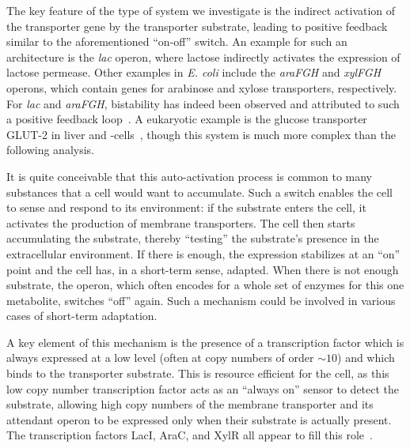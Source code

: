 \documentclass[10pt,letterpaper]{article}
\begin{document}
	The key feature of the type of system we investigate is the indirect activation of
	the transporter gene by the transporter substrate, leading to positive
	feedback similar to the aforementioned ``on-off'' switch. An example for
	such an architecture is the \emph{lac} operon, where lactose indirectly
	activates the expression of lactose permease. Other examples in \emph{E.
		coli} include the \emph{araFGH} and \emph{xylFGH} operons, which contain genes for
	arabinose and xylose transporters, respectively. For \emph{lac} and
	\emph{araFGH}, bistability has indeed been observed and attributed to such a
	positive feedback
	loop~\cite{Novick1957,Santillan2008,Ozbudak2004,Narang2008,Choi2008,Fritz2014,Jenkins2017,Siegele1997}.
	A eukaryotic example is the glucose transporter GLUT-2 in liver and
	\textbeta-cells~\cite{Bae2010,Tiedge1991}, though this system is much more
	complex than the following analysis.
	
	It is quite conceivable that this auto-activation process is common to many
	substances that a cell would want to accumulate. Such a switch enables the
	cell to sense and respond to its environment: if the substrate enters the
	cell, it activates the production of membrane transporters. The cell then
	starts accumulating the substrate, thereby ``testing'' the substrate's
	presence in the extracellular environment. If there is enough, the
	expression stabilizes at an ``on'' point and the cell has, in a short-term
	sense, adapted. When there is not enough substrate, the operon, which
	often encodes for a whole set of enzymes for this one metabolite, switches
	``off'' again. Such a mechanism could be involved in various cases of
	short-term adaptation.
	
	A key element of this mechanism is the presence of a transcription factor
	which is always expressed at a low level (often at copy numbers
	of order $\sim10$) and which binds to the transporter substrate.
	This is resource efficient for the cell, as this low copy number
	transcription factor acts as an ``always on'' sensor to detect
	the substrate, allowing high copy numbers of the membrane transporter
	and its attendant operon to be expressed only when
	their substrate is actually present. The transcription factors
	LacI, AraC, and XylR all appear to fill this
	role~\cite{Novick1957,Santillan2008,Ozbudak2004,Narang2008,Choi2008,Fritz2014,Jenkins2017,Siegele1997,Song1997,Schmidt2015}.
	
\end{document}
